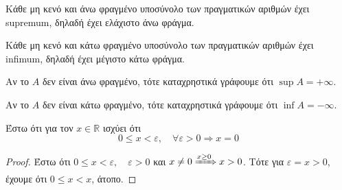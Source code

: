 \begin{myitemize}
  \item Κάθε μη κενό και άνω φραγμένο υποσύνολο των πραγματικών αριθμών έχει 
    supremum, δηλαδή έχει ελάχιστο άνω φράγμα.
  \item Κάθε μη κενό και κάτω  φραγμένο υποσύνολο των πραγματικών αριθμών έχει 
    infimum, δηλαδή έχει μέγιστο κάτω φράγμα.
\end{myitemize}

\begin{rem}
\item {}
  \begin{myitemize}
    \item Αν το $A$ δεν είναι άνω φραγμένο, τότε καταχρηστικά  γράφουμε ότι 
      $ \sup A = + \infty $.
    \item Αν το $A$ δεν είναι κάτω φραγμένο, τότε καταχρηστικά  γράφουμε ότι 
      $ \inf A = - \infty $.
  \end{myitemize}
\end{rem}

\begin{mybox3}
\begin{prop}
  \label{prop:epsilonprot}
  Έστω ότι για τον $x \in \mathbb{R}$ ισχύει ότι 
  \[
    0 \leq x < \varepsilon, \quad \forall \varepsilon >0 \Rightarrow x =0 
  \]
\end{prop}
\end{mybox3}
\begin{proof}
  Έστω ότι $ 0 \leq x < \varepsilon, \quad \varepsilon >0 $ και 
  $ x \neq 0 \xRightarrow{x \geq 0} x > 0$. Τότε για $ \varepsilon = 
  x > 0$, έχουμε ότι $ 0 \leq x < x $, άτοπο.
\end{proof}

